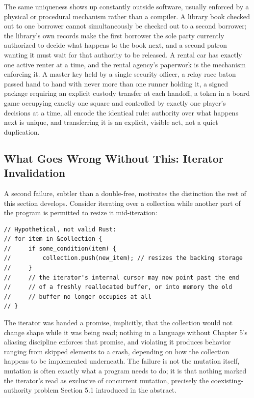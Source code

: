 \documentclass[11pt]{book}
\begin{document}
The same uniqueness shows up constantly outside software, usually enforced by a physical or procedural mechanism rather than a compiler. A library book checked out to one borrower cannot simultaneously be checked out to a second borrower; the library's own records make the first borrower the sole party currently authorized to decide what happens to the book next, and a second patron wanting it must wait for that authority to be released. A rental car has exactly one active renter at a time, and the rental agency's paperwork is the mechanism enforcing it. A master key held by a single security officer, a relay race baton passed hand to hand with never more than one runner holding it, a signed package requiring an explicit custody transfer at each handoff, a token in a board game occupying exactly one square and controlled by exactly one player's decisions at a time, all encode the identical rule: authority over what happens next is unique, and transferring it is an explicit, visible act, not a quiet duplication.

\subsection*{What Goes Wrong Without This: Iterator Invalidation}

A second failure, subtler than a double-free, motivates the distinction the rest of this section develops. Consider iterating over a collection while another part of the program is permitted to resize it mid-iteration:

\begin{lstlisting}
// Hypothetical, not valid Rust:
// for item in &collection {
//     if some_condition(item) {
//         collection.push(new_item); // resizes the backing storage
//     }
//     // the iterator's internal cursor may now point past the end
//     // of a freshly reallocated buffer, or into memory the old
//     // buffer no longer occupies at all
// }
\end{lstlisting}

The iterator was handed a promise, implicitly, that the collection would not change shape while it was being read; nothing in a language without Chapter 5's aliasing discipline enforces that promise, and violating it produces behavior ranging from skipped elements to a crash, depending on how the collection happens to be implemented underneath. The failure is not the mutation itself, mutation is often exactly what a program needs to do; it is that nothing marked the iterator's read as exclusive of concurrent mutation, precisely the coexisting-authority problem Section 5.1 introduced in the abstract.
\end{document}
